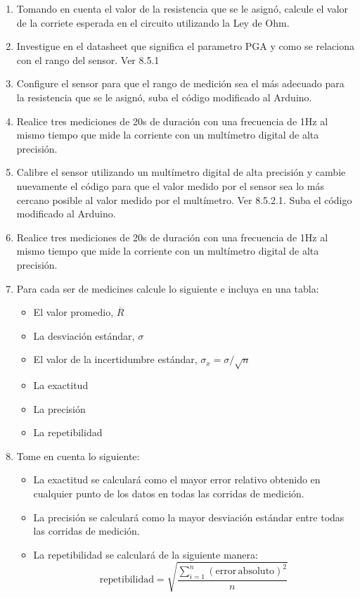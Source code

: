\begin{enumerate}
    \item Tomando en cuenta el valor de la resistencia que se le asignó, calcule el valor de la corriete esperada en el circuito utilizando la Ley de Ohm.
    \item Investigue en el datasheet que significa el parametro PGA y como se relaciona con el rango del sensor. Ver 8.5.1
    \item Configure el sensor para que el rango de medición sea el más adecuado para la resistencia que se le asignó, suba el código modificado al Arduino.
    \item Realice tres mediciones de 20s de duración con una frecuencia de 1Hz al mismo tiempo que mide la corriente con un multímetro digital de alta precisión.
    \item Calibre el sensor utilizando un multímetro digital de alta precisión y cambie nuevamente el código para que el valor medido por el sensor sea lo más cercano posible al valor medido por el multímetro. Ver 8.5.2.1. Suba el código modificado al Arduino.
    \item Realice tres mediciones de 20s de duración con una frecuencia de 1Hz al mismo tiempo que mide la corriente con un multímetro digital de alta precisión.
    \item Para cada ser de medicines calcule lo siguiente e incluya en una tabla:
        \begin{itemize}
            \item El valor promedio, $\overline{R}$ 
            \item La desviación estándar, $\sigma$
            \item El valor de la incertidumbre estándar, $\sigma_x = \sigma / \sqrt{n}$
            \item La exactitud
            \item La precisión
            \item La repetibilidad
        \end{itemize}
        
    \item Tome en cuenta lo siguiente:
        \begin{itemize}
            \item La exactitud se calculará como el mayor error relativo obtenido en cualquier punto de los datos en todas las corridas de medición.
            \item La precisión se calculará como la mayor desviación estándar entre todas las corridas de medición.
            \item La repetibilidad se calculará de la siguiente manera:
            \begin{equation*}
                \mathrm{repetibilidad} = \sqrt{\dfrac{\sum_{i=1}^n(\mathrm{error\,absoluto})^2}{n}}
            \end{equation*}
        \end{itemize}



\end{enumerate}
